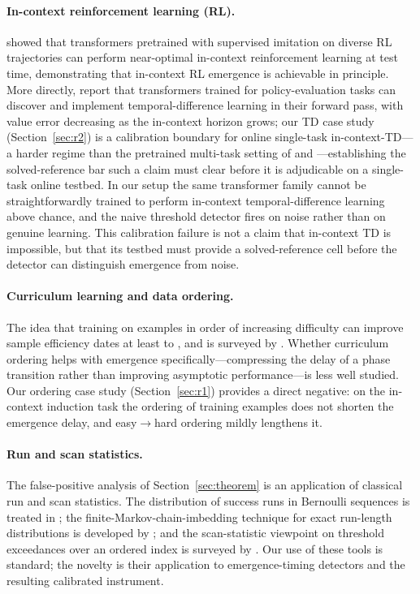 \documentclass[11pt]{article}
\theoremstyle{plain}
\theoremstyle{definition}
\begin{document}
\paragraph{In-context reinforcement learning (RL).}
\citet{lee2023icrl} showed that transformers pretrained with supervised imitation
on diverse RL trajectories can perform near-optimal in-context reinforcement learning
at test time, demonstrating that in-context RL emergence is achievable
in principle.
More directly, \citet{wang2024tdtransformers} report that transformers trained for
policy-evaluation tasks can discover and implement temporal-difference learning in their
forward pass, with value error decreasing as the in-context horizon grows; our TD case
study (Section~\ref{sec:r2}) is a calibration boundary for online single-task
in-context-TD---a harder regime than the pretrained multi-task setting of
\citet{wang2024tdtransformers} and \citet{lee2023icrl}---establishing the solved-reference
bar such a claim must clear before it is adjudicable on a single-task online testbed.
In our setup the same transformer family cannot be straightforwardly
trained to perform in-context temporal-difference learning above chance, and the naive
threshold detector fires on noise rather than on genuine learning.
This calibration failure is not a claim that in-context TD is impossible, but that
its testbed must provide a solved-reference cell before the detector can distinguish
emergence from noise.

\paragraph{Curriculum learning and data ordering.}
The idea that training on examples in order of increasing difficulty can improve
sample efficiency dates at least to \citet{bengio2009curriculum}, and is surveyed by \citet{soviany2022curriculum}.
Whether curriculum ordering helps with emergence specifically---compressing the
delay of a phase transition rather than improving asymptotic performance---is less
well studied.
Our ordering case study (Section~\ref{sec:r1}) provides a direct negative: on the
in-context induction task the ordering of training examples does not shorten the emergence
delay, and easy$\to$hard ordering mildly lengthens it.

\paragraph{Run and scan statistics.}
The false-positive analysis of Section~\ref{sec:theorem} is an application of classical
run and scan statistics. The distribution of success runs in Bernoulli sequences is
treated in \citet{feller1968}; the finite-Markov-chain-imbedding technique for exact
run-length distributions is developed by \citet{fulou2003runs}; and the scan-statistic
viewpoint on threshold exceedances over an ordered index is surveyed by
\mbox{\citet{glaz2001scan}}. Our use of these tools is standard; the novelty is their application
to emergence-timing detectors and the resulting calibrated instrument.
\end{document}
